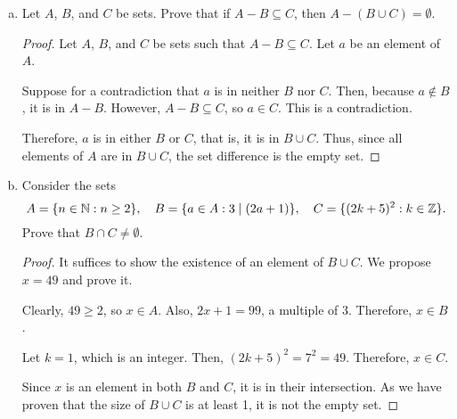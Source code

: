 \documentclass{agony}
\begin{document}
\question \begin{enumerate}[(a)]
  \item Let $A$, $B$, and $C$ be sets.
        Prove that if $A-B \subseteq C$, then $A - (B \cup C) = \emptyset$.
        \begin{proof}
          Let $A$, $B$, and $C$ be sets such that $A-B \subseteq C$.
          Let $a$ be an element of $A$.

          Suppose for a contradiction that $a$ is in neither $B$ nor $C$.
          Then, because $a\not\in B$, it is in $A-B$.
          However, $A-B \subseteq C$, so $a \in C$.
          This is a contradiction.

          Therefore, $a$ is in either $B$ or $C$, that is, it is in $B \cup C$.
          Thus, since all elements of $A$ are in $B \cup C$, the set difference is the empty set.
        \end{proof}
  \item Consider the sets \begin{equation*}
          A = \{n\in\mathbb{N} : n \geq 2\}, \quad B=\{a\in A : 3 \mid (2a+1)\}, \quad C=\{(2k+5)^2 : k\in\mathbb{Z}\}.
        \end{equation*}
        Prove that $B \cap C \neq \emptyset$.
        \begin{proof}
          It suffices to show the existence of an element of $B \cup C$.
          We propose $x = 49$ and prove it.

          Clearly, $49 \geq 2$, so $x \in A$.
          Also, $2x+1 = 99$, a multiple of 3.
          Therefore, $x \in B$.

          Let $k = 1$, which is an integer.
          Then, $(2k+5)^2 = 7^2 = 49$.
          Therefore, $x \in C$.

          Since $x$ is an element in both $B$ and $C$, it is in their intersection.
          As we have proven that the size of $B \cup C$ is at least 1, it is not the empty set.
        \end{proof}
\end{enumerate}
\end{document}
